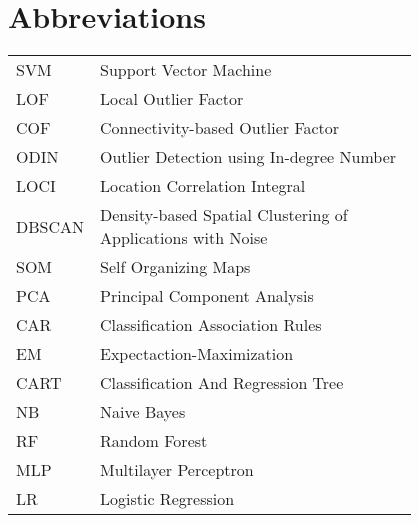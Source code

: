 \chapter*{Abbreviations}

\begin{flushleft}
\begin{tabular}{l p{0.8\linewidth}}
	
SVM & Support Vector Machine \\
LOF & Local Outlier Factor \\
COF & Connectivity-based Outlier Factor \\
ODIN & Outlier Detection using In-degree Number \\
LOCI & Location Correlation Integral \\
DBSCAN & Density-based Spatial Clustering of Applications with Noise \\
SOM & Self Organizing Maps \\
PCA & Principal Component Analysis \\
CAR & Classification Association Rules \\
EM & Expectaction-Maximization \\
CART & Classification And Regression Tree \\
NB & Naive Bayes \\
RF & Random Forest \\
MLP & Multilayer Perceptron \\
LR & Logistic Regression

\end{tabular}
\end{flushleft}

